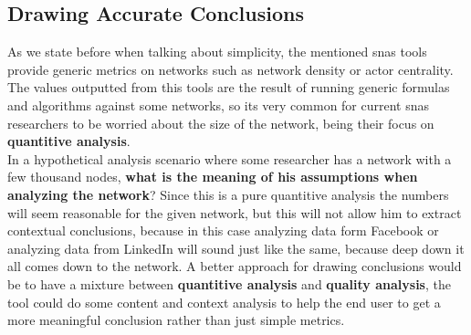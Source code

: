 \subsection{Drawing Accurate Conclusions}
As we state before when talking about simplicity, the mentioned \glspl{sna} tools provide generic metrics on networks such as network density or actor centrality. The values outputted from this tools are the result of running generic formulas and algorithms against some networks, so its very common for current \glspl{sna} researchers to be worried about the size of the network, being their focus on \textbf{quantitive analysis}.\\
\indent In a hypothetical analysis scenario where some researcher has a network with a few thousand nodes, \textbf{what is the meaning of his assumptions when analyzing the network}? Since this is a pure quantitive analysis the numbers will seem reasonable for the given network, but this will not allow him to extract contextual conclusions, because in this case analyzing data form Facebook or analyzing data from LinkedIn will sound just like the same, because deep down it all comes down to the network. A better approach for drawing conclusions would be to have a mixture between \textbf{quantitive analysis} and \textbf{quality analysis}, the tool could do some content and context analysis to help the end user to get a more meaningful conclusion rather than just simple metrics.

